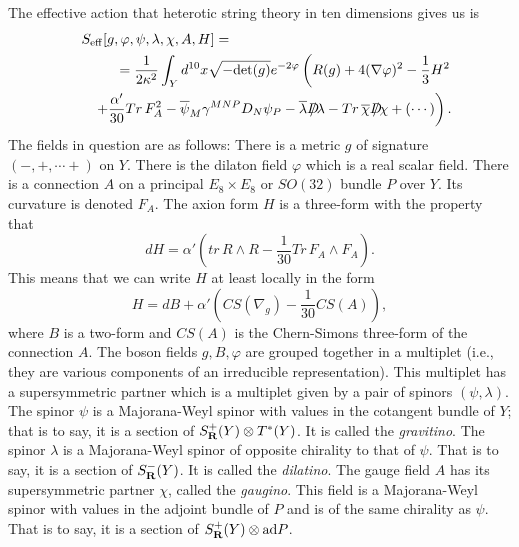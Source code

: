 The effective action that heterotic string theory in ten dimensions
gives us is
\begin{eqnarray*}
\lefteqn{S_{\rm eff}[g,\varphi,\psi,\lambda,\chi,A,H] =} & &   \\
\quad & &= \frac{1}{2\kappa^2}\int_Y d^{10}x\sqrt{-{\rm
det}(g)}e^{-2\varphi}\left(R(g)+4(\nabla\varphi)^2-\frac{1}{3}H^2\right.  \\ 
& & \left. +\frac{\alpha'}{30}Tr\,
F_A^2-\overline\psi_M\gamma^{MNP}D_N\psi_P -\overline{\lambda}\dirac
\lambda -Tr\,\overline{\chi}\dirac\chi+\left(\cdots\right)\right).
\end{eqnarray*}
The fields in question are as follows:
There is a metric $g$ of signature $(-,+,\cdots+)$ on $Y$.
There is the dilaton field $\varphi$ which is a real scalar field.
There is a connection $A$
on a principal $E_8\times E_8$ or $SO(32)$ bundle
$P$ over $Y$. Its curvature is denoted $F_A$.
The axion form $H$ is a three-form with the property that
$$dH=\alpha'(tr\,R\wedge R-\frac{1}{30}Tr\, F_A\wedge F_A).$$
This means that we can write $H$ at least locally in the
form
$$H=dB+\alpha'\left(CS(\nabla_g)-\frac{1}{30}CS(A)\right),$$
where $B$ is a two-form and $CS(A)$ is the Chern-Simons three-form of
the connection $A$.
The boson fields $g,B,\varphi$ are grouped together in a multiplet (i.e.,
they are various components of an irreducible representation).  This
multiplet has a supersymmetric partner which is a multiplet given by a
pair of spinors $(\psi,\lambda)$. 
The spinor $\psi$  is a Majorana-Weyl spinor with values in the cotangent
bundle of $Y$; that is to say, it is  a section of
$S^+_{\bf R}(Y)\otimes T^*(Y)$.  It  is called the
{\sl gravitino}.
The spinor $\lambda$ is a Majorana-Weyl spinor of opposite
chirality to that of $\psi$.  That is to say, it is a section of
$S^-_{\bf R}(Y)$. It is  called the {\sl dilatino}.
The gauge field $A$ has its 
supersymmetric partner $\chi$, called the {\sl
gaugino}.  This field  is a Majorana-Weyl
spinor with values in the adjoint bundle of $P$
and is of the same chirality as $\psi$. That is to say, it is a
section of $S^+_{\bf R}(Y)\otimes {\rm ad} P$.



